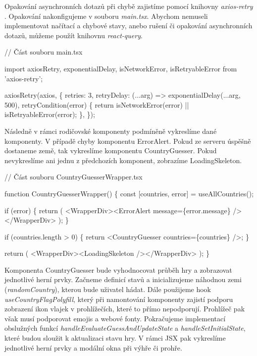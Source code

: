 Opakování asynchronních dotazů při chybě zajistíme pomocí knihovny \emph{axios-retry} \cite{axiosretrylib}. Opakování nakonfigujeme v souboru \emph{main.tsx}. 
Abychom nemuseli implementovat načítací a chybové stavy, anebo rušení či opakování asynchronních dotazů, můžeme použít knihovnu \emph{react-query}.

\begin{prog}
// Část souboru main.tsx

import axiosRetry, {exponentialDelay, isNetworkError, isRetryableError}
from 'axios-retry';

axiosRetry(axios, \{
  retries: 3,
  retryDelay: (...arg) => exponentialDelay(...arg, 500),
  retryCondition(error) \{
    return isNetworkError(error) || isRetryableError(error);
  \},
\});
\end{prog}

Následně v rámci rodičovské komponenty podmíněně vykreslíme dané komponenty. V případě chyby komponentu ErrorAlert. Pokud ze serveru úspěšně dostaneme země, tak vykreslíme komponentu CountryGuesser. 
Pokud nevykreslíme ani jednu z předchozích komponent, zobrazíme LoadingSkeleton.

\begin{prog}
// Část souboru CountryGuesserWrapper.tsx

function CountryGuesserWrapper() \{
  const [countries, error] = useAllCountries();

  if (error) \{
    return (
      <WrapperDiv><ErrorAlert message=\{error.message\} /></WrapperDiv>
    );
  \}

  if (countries.length > 0) \{
    return <CountryGuesser countries=\{countries\} />;
  \}

  return (
    <WrapperDiv><LoadingSkeleton /></WrapperDiv>
  );
\}
\end{prog}

Komponenta CountryGuesser bude vyhodnocovat průběh hry a zobrazovat jednotlivé herní prvky. Začneme definicí stavů a inicializujeme náhodnou zemi (\emph{randomCountry}), kterou bude uživatel hádat. 
Dále použijeme hook \emph{useCountryFlagPolyfill}, který při namontování komponenty zajistí podporu zobrazení ikon vlajek v prohlížečích, které to přímo nepodporují. 
Prohlížeč pak však musí podporovat emojis a webové fonty. Pokračujeme implementací obslužných funkcí \emph{handleEvaluateGuessAndUpdateState} a \emph{handleSetInitialState}, které budou sloužit k aktualizaci stavu hry. 
V rámci JSX pak vykreslíme jednotlivé herní prvky a modální okna při výhře či prohře.

